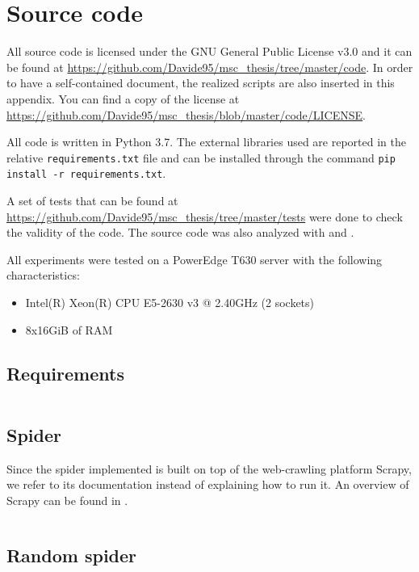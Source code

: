\chapter{Source code}
All source code is licensed under the GNU General Public License v3.0 and it can be found at \url{https://github.com/Davide95/msc_thesis/tree/master/code}.
In order to have a self-contained document, the realized scripts are also inserted in this appendix.
You can find a copy of the license at \url{https://github.com/Davide95/msc_thesis/blob/master/code/LICENSE}.

All code is written in Python 3.7. The external libraries used are reported in the relative \texttt{requirements.txt} file and can be installed through the command \texttt{pip install -r requirements.txt}.

A set of tests that can be found at \url{https://github.com/Davide95/msc_thesis/tree/master/tests} were done to check the validity of the code.
The source code was also analyzed with  and .

All experiments were tested on a PowerEdge T630 server with the following characteristics:
\begin{itemize}
    \item Intel(R) Xeon(R) CPU E5-2630 v3 @ 2.40GHz (2 sockets)
    \item 8x16GiB of RAM
\end{itemize}

\section{Requirements}
\begin{minipage}{\linewidth}
    \inputminted{text}{../code/requirements.txt}
\end{minipage}

\pagebreak
\section{Spider} \label{spider}

Since the spider implemented is built on top of the web-crawling platform Scrapy, we refer to its documentation instead of explaining how to run it.
An overview of Scrapy can be found in \cite{kouzis2016learning}.

\inputminted{Python}{../code/custom_spider.py}

\pagebreak
\section{Random spider} \label{randomspider}

